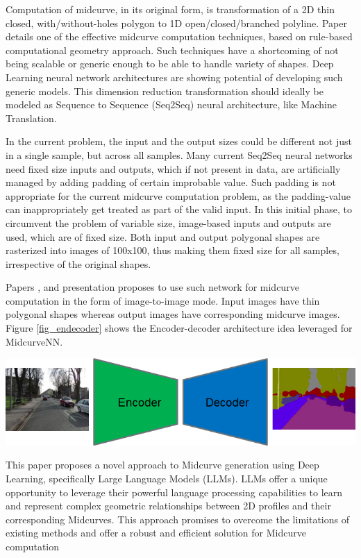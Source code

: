 \documentclass[conference]{IEEEtran}
\begin{document}
Computation of midcurve, in its original form, is transformation of a 2D thin closed, with/without-holes polygon to 1D open/closed/branched polyline. Paper \cite{dimred2017} details one of the effective midcurve computation techniques, based on rule-based computational geometry approach. Such techniques have a shortcoming of not being scalable or generic enough to be able to handle variety of shapes. Deep Learning neural network architectures are showing potential of developing such generic models. This dimension reduction transformation should ideally be modeled as Sequence to Sequence (Seq2Seq) neural architecture, like Machine Translation.

In the current problem, the input and the output sizes could be different not just in a single sample, but across all samples. Many current Seq2Seq neural networks need fixed size inputs and outputs, which if not present in data, are artificially managed by adding padding of certain improbable value. Such padding is not appropriate for the current midcurve computation problem, as the padding-value can inappropriately get treated as part of the valid input. In this initial phase, to circumvent the problem of variable size, image-based inputs and outputs are used, which are of fixed size. Both input and output polygonal shapes are rasterized into images of 100x100, thus making them fixed size for all samples, irrespective of the original shapes.


Papers \cite{midcurvenn2022}, \cite{midcurvenn2023} and presentation \cite{Kulkarni2023} proposes to use such network for midcurve computation in the form of image-to-image mode. Input images have thin polygonal shapes whereas output images have corresponding midcurve images. Figure \ref{fig_endecoder} shows the Encoder-decoder architecture idea leveraged for MidcurveNN.

     \begin{center}
	\includegraphics[width=0.8\linewidth]{images/enc-dec}
	 \cite{DasSeg2019}
	\label{fig_endecoder}
    \end{center}
    
This paper proposes a novel approach to Midcurve generation using Deep Learning, specifically Large Language Models (LLMs). LLMs offer a unique opportunity to leverage their powerful language processing capabilities to learn and represent complex geometric relationships between 2D profiles and their corresponding Midcurves. This approach promises to overcome the limitations of existing methods and offer a robust and efficient solution for Midcurve computation
\end{document}
